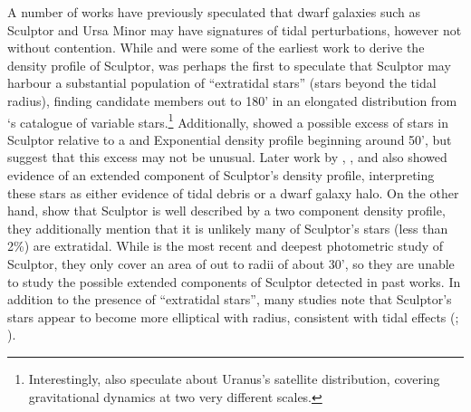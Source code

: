 A number of works have previously speculated that dwarf galaxies such as
Sculptor and Ursa Minor may have signatures of tidal perturbations,
however not without contention. While \citet{hodge1961} and
\citet{demers+krautter+kunkel1980} were some of the earliest work to
derive the density profile of Sculptor, \citet{innanen+papp1979} was
perhaps the first to speculate that Sculptor may harbour a substantial
population of ``extratidal stars'' (stars beyond the tidal radius),
finding candidate members out to 180' in an elongated distribution from
\citet{vanagt1978}`s catalogue of variable stars.\footnote{Interestingly,
  \citet{innanen+papp1979} also speculate about Uranus's satellite
  distribution, covering gravitational dynamics at two very different
  scales.} Additionally, \citet{eskridge1988} showed a possible excess
of stars in Sculptor relative to a \citet{king1962} and Exponential
density profile beginning around 50', but suggest that this excess may
not be unusual. Later work by \citet{IH1995}, \citet{walcher+2003}, and
\citet{westfall+2006} also showed evidence of an extended component of
Sculptor's density profile, interpreting these stars as either evidence
of tidal debris or a dwarf galaxy halo. On the other hand,
\citet{coleman+dacosta+bland-hawthorn2005} show that Sculptor is well
described by a two component density profile, they additionally mention
that it is unlikely many of Sculptor's stars (less than 2\%) are
extratidal. While \citet{munoz+2018} is the most recent and deepest
photometric study of Sculptor, they only cover an area of out to radii
of about 30', so they are unable to study the possible extended
components of Sculptor detected in past works. In addition to the
presence of ``extratidal stars'', many studies note that Sculptor's
stars appear to become more elliptical with radius, consistent with
tidal effects (\citet{IH1995}; \citet{westfall+2006}).

